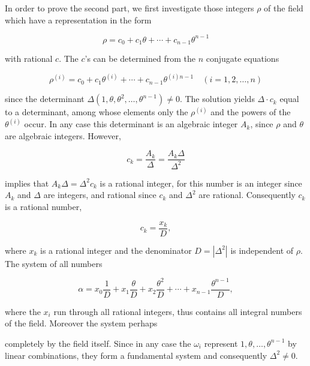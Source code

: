 In order to prove the second part, we first investigate those integers $\rho$ of the field which have a representation in the form

$$\rho = c_0 + c_1 \theta + \cdots + c_{n-1} \theta^{n-1}$$

with rational $c$. The $c$'s can be determined from the $n$ conjugate equations

$$\rho^{(i)} = c_0 + c_1 \theta^{(i)} + \cdots + c_{n-1} \theta^{(i)n-1} \quad (i = 1, 2, \ldots, n)$$

since the determinant $\Delta(1, \theta, \theta^2, \ldots, \theta^{n-1}) \neq 0$. The solution yields $\Delta \cdot c_k$ equal to a determinant, among whose elements only the $\rho^{(i)}$ and the powers of the $\theta^{(i)}$ occur. In any case this determinant is an algebraic integer $A_k$, since $\rho$ and $\theta$ are algebraic integers. However,

$$c_k = \frac{A_k}{\Delta} = \frac{A_k \Delta}{\Delta^2}$$

implies that $A_k \Delta = \Delta^2 c_k$ is a rational integer, for this number is an integer since $A_k$ and $\Delta$ are integers, and rational since $c_k$ and $\Delta^2$ are rational. Consequently $c_k$ is a rational number,

$$c_k = \frac{x_k}{D},$$

where $x_k$ is a rational integer and the denominator $D = |\Delta^2|$ is independent of $\rho$. The system of all numbers

$$\alpha = x_0 \frac{1}{D} + x_1 \frac{\theta}{D} + x_2 \frac{\theta^2}{D} + \cdots + x_{n-1} \frac{\theta^{n-1}}{D},$$

where the $x_i$ run through all rational integers, thus contains all integral numbers of the field. Moreover the system perhaps

completely by the field itself. Since in any case the $\omega_i$ represent $1, \theta, \ldots, \theta^{n-1}$ by linear combinations, they form a fundamental system and consequently $\Delta^2 \neq 0$.
